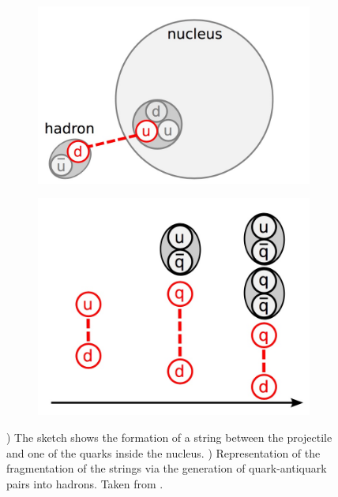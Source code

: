 \begin{figure}[htbp!]
  \centering
  \begin{subfigure}[t]{0.49\textwidth}
    \includegraphics[width=1.\linewidth]{chap4/fig/QGS_nucleus.jpeg}
    \caption{} \label{fig:QGS_nucleus}
  \end{subfigure}
  \hfill
  \begin{subfigure}[t]{0.49\textwidth}
    \includegraphics[width=1.\linewidth]{chap4/fig/QGS_stringfrag.jpeg}
    \caption{} \label{fig:QGS_string}
  \end{subfigure}
  \caption{) The sketch shows the formation of a string between the projectile and one of the quarks inside the nucleus. ) Representation of the fragmentation of the strings via the generation of quark-antiquark pairs into hadrons. Taken from \cite{Feege2011}.}
\end{figure}

